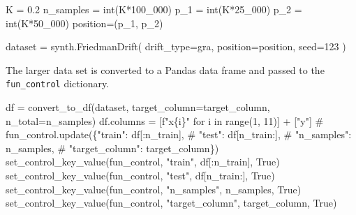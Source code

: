 \documentclass[
  letterpaper,
  DIV=11,
  numbers=noendperiod]{scrreprt}
\newenvironment{Shaded}{\begin{snugshade}}{\end{snugshade}}
\newcommand{\BuiltInTok}[1]{\textcolor[rgb]{0.00,0.23,0.31}{#1}}
\newcommand{\CommentTok}[1]{\textcolor[rgb]{0.37,0.37,0.37}{#1}}
\newcommand{\ControlFlowTok}[1]{\textcolor[rgb]{0.00,0.23,0.31}{#1}}
\newcommand{\DecValTok}[1]{\textcolor[rgb]{0.68,0.00,0.00}{#1}}
\newcommand{\FloatTok}[1]{\textcolor[rgb]{0.68,0.00,0.00}{#1}}
\newcommand{\KeywordTok}[1]{\textcolor[rgb]{0.00,0.23,0.31}{#1}}
\newcommand{\NormalTok}[1]{\textcolor[rgb]{0.00,0.23,0.31}{#1}}
\newcommand{\OperatorTok}[1]{\textcolor[rgb]{0.37,0.37,0.37}{#1}}
\newcommand{\SpecialCharTok}[1]{\textcolor[rgb]{0.37,0.37,0.37}{#1}}
\newcommand{\SpecialStringTok}[1]{\textcolor[rgb]{0.13,0.47,0.30}{#1}}
\newcommand{\StringTok}[1]{\textcolor[rgb]{0.13,0.47,0.30}{#1}}
\newcommand{\VariableTok}[1]{\textcolor[rgb]{0.07,0.07,0.07}{#1}}
\begin{document}
\begin{Shaded}
\begin{Highlighting}[]
\NormalTok{K }\OperatorTok{=} \FloatTok{0.2}
\NormalTok{n\_samples }\OperatorTok{=} \BuiltInTok{int}\NormalTok{(K}\OperatorTok{*}\DecValTok{100\_000}\NormalTok{)}
\NormalTok{p\_1 }\OperatorTok{=} \BuiltInTok{int}\NormalTok{(K}\OperatorTok{*}\DecValTok{25\_000}\NormalTok{)}
\NormalTok{p\_2 }\OperatorTok{=} \BuiltInTok{int}\NormalTok{(K}\OperatorTok{*}\DecValTok{50\_000}\NormalTok{)}
\NormalTok{position}\OperatorTok{=}\NormalTok{(p\_1, p\_2)}
\end{Highlighting}
\end{Shaded}

\begin{Shaded}
\begin{Highlighting}[]
\NormalTok{dataset }\OperatorTok{=}\NormalTok{ synth.FriedmanDrift(}
\NormalTok{   drift\_type}\OperatorTok{=}\StringTok{\textquotesingle{}gra\textquotesingle{}}\NormalTok{,}
\NormalTok{   position}\OperatorTok{=}\NormalTok{position,}
\NormalTok{   seed}\OperatorTok{=}\DecValTok{123}
\NormalTok{)}
\end{Highlighting}
\end{Shaded}

The larger data set is converted to a Pandas data frame and passed to
the \texttt{fun\_control} dictionary.

\begin{Shaded}
\begin{Highlighting}[]
\NormalTok{df }\OperatorTok{=}\NormalTok{ convert\_to\_df(dataset, target\_column}\OperatorTok{=}\NormalTok{target\_column, n\_total}\OperatorTok{=}\NormalTok{n\_samples)}
\NormalTok{df.columns }\OperatorTok{=}\NormalTok{ [}\SpecialStringTok{f"x}\SpecialCharTok{\{}\NormalTok{i}\SpecialCharTok{\}}\SpecialStringTok{"} \ControlFlowTok{for}\NormalTok{ i }\KeywordTok{in} \BuiltInTok{range}\NormalTok{(}\DecValTok{1}\NormalTok{, }\DecValTok{11}\NormalTok{)] }\OperatorTok{+}\NormalTok{ [}\StringTok{"y"}\NormalTok{]}
\CommentTok{\# fun\_control.update(\{"train": df[:n\_train],}
\CommentTok{\#                     "test": df[n\_train:],}
\CommentTok{\#                     "n\_samples": n\_samples,}
\CommentTok{\#                     "target\_column": target\_column\})}
\NormalTok{set\_control\_key\_value(fun\_control, }\StringTok{"train"}\NormalTok{, df[:n\_train], }\VariableTok{True}\NormalTok{)}
\NormalTok{set\_control\_key\_value(fun\_control, }\StringTok{"test"}\NormalTok{, df[n\_train:], }\VariableTok{True}\NormalTok{)}
\NormalTok{set\_control\_key\_value(fun\_control, }\StringTok{"n\_samples"}\NormalTok{, n\_samples, }\VariableTok{True}\NormalTok{)}
\NormalTok{set\_control\_key\_value(fun\_control, }\StringTok{"target\_column"}\NormalTok{, target\_column, }\VariableTok{True}\NormalTok{)}
\end{Highlighting}
\end{Shaded}
\end{document}
